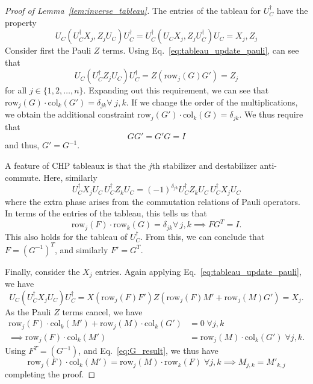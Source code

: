 \begin{proof}[Proof of Lemma~\ref{lem:inverse_tableau}]
The entries of the tableau for $U_{C}^{\dagger}$ have the property
\[
U_{C}\left(U_{C}^{\dagger}X_{j},Z_{j}U_{C}\right)U_{C}^{\dagger} = U_{C}^{\dagger}\left(U_{C}X_{j},Z_{j}U_{C}^{\dagger}\right)U_{C}=X_{j},Z_{j}
\]
Consider first the Pauli $Z$ terms. Using Eq.~\ref{eq:tableau_update_pauli}, can see that
\[U_{C}\left(U_{C}^{\dagger}Z_{j}U_{C}\right)U_{C}^{\dagger} = Z(\text{row}_{j}(G)G') = Z_{j}\]
for all $j\in\{1,2,\dots,n\}$. Expanding out this requirement, we can see that $\text{row}_{j}(G)\cdot \text{col}_{k}(G') = \delta_{jk}\forall\;j,k$. If we change the order of the multiplications, we obtain the additional constraint $\text{row}_{j}(G')\cdot \text{col}_{k}(G)=\delta_{jk}$. We thus require that
\begin{equation}
GG'=G'G=I
\label{eq:G_result}
\end{equation}
and thus, $G'=G^{-1}$.\par
A feature of CHP tableaux is that the $j$th stabilizer and destabilizer anti-commute. Here, similarly
\[U_{C}^{\dagger}X_{j}U_{C}\,U_{C}^{\dagger}Z_{k}U_{C}=\left(-1\right)^{\delta_{jk}}U_{C}^{\dagger}Z_{k}U_{C}\,U_{C}^{\dagger}X_{j}U_{C}\]
where the extra phase arises from the commutation relations of Pauli operators. In terms of the entries of the tableau, this tells us that
\[\text{row}_{j}(F)\cdot\text{row}_{k}(G)=\delta_{jk}\forall\,j,k\implies FG^{T}=I.\]
This also holds for the tableau of $U_{C}^{\dagger}$. From this, we can conclude that $F=\left(G^{-1}\right)^{T}$, and similarly $F'=G^{T}$.\par
Finally, consider the $X_{j}$ entries. Again applying Eq.~\ref{eq:tableau_update_pauli}, we have
\[U_{C}\left(U_{C}^{\dagger}X_{j}U_{C}\right)U_{C}^{\dagger}= X(\text{row}_{j}(F)F')Z(\text{row}_{j}(F)M' + \text{row}_{j}(M)G') = X_{j}.\]
As the Pauli $Z$ terms cancel, we have
\begin{align*}
\text{row}_{j}(F)\cdot\text{col}_{k}(M')+\text{row}_{j}(M)\cdot\text{col}_{k}(G')&=0\;\forall j,k\\
\implies \text{row}_{j}(F)\cdot\text{col}_{k}(M') &= \text{row}_{j}(M)\cdot\text{col}_{k}(G')\;\forall j,k.
\end{align*}
Using $F^{T}=(G^{-1})$, and Eq.~\ref{eq:G_result}, we thus have
\begin{equation}
\text{row}_{j}(F)\cdot\text{col}_{k}(M')=\text{row}_{j}(M)\cdot\text{row}_{k}(F)\;\forall j,k\implies M_{j,k}=M'_{k,j}
\end{equation}
completing the proof.
\end{proof}
